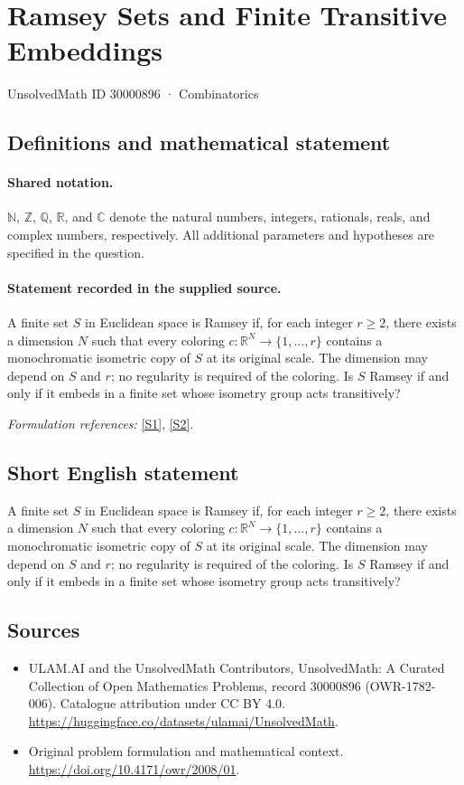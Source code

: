 \documentclass[11pt]{article}
\newcommand{\sref}[2]{\hyperlink{source:#1:#2}{[S#2]}}
\begin{document}
\setcounter{section}{30000895}
\section{Ramsey Sets and Finite Transitive Embeddings}\label{30000896}
{\small UnsolvedMath ID 30000896 · Combinatorics}
\subsection{Definitions and mathematical statement}

\paragraph{Shared notation.}$\mathbb N$, $\mathbb Z$, $\mathbb Q$, $\mathbb R$, and $\mathbb C$ denote the natural numbers, integers, rationals, reals, and complex numbers, respectively. All additional parameters and hypotheses are specified in the question.


\paragraph{Statement recorded in the supplied source.}
A finite set $S$ in Euclidean space is Ramsey if, for each integer $r\ge2$, there exists a dimension $N$ such that every coloring $c:\mathbb R^N\to\{1,\ldots,r\}$ contains a monochromatic isometric copy of $S$ at its original scale. The dimension may depend on $S$ and $r$; no regularity is required of the coloring. Is $S$ Ramsey if and only if it embeds in a finite set whose isometry group acts transitively?
\par\smallskip\textit{Formulation references:} \sref{30000896}{1}, \sref{30000896}{2}.
\subsection{Short English statement}
A finite set $S$ in Euclidean space is Ramsey if, for each integer $r\ge2$, there exists a dimension $N$ such that every coloring $c:\mathbb R^N\to\{1,\ldots,r\}$ contains a monochromatic isometric copy of $S$ at its original scale. The dimension may depend on $S$ and $r$; no regularity is required of the coloring. Is $S$ Ramsey if and only if it embeds in a finite set whose isometry group acts transitively?
\subsection{Sources}
\begin{itemize}
\item[\hypertarget{source:30000896:1}{S1}] ULAM.AI and the UnsolvedMath Contributors, UnsolvedMath: A Curated Collection of Open Mathematics Problems, record 30000896 (OWR-1782-006). Catalogue attribution under CC BY 4.0.
\url{https://huggingface.co/datasets/ulamai/UnsolvedMath}.
\item[\hypertarget{source:30000896:2}{S2}] Original problem formulation and mathematical context.
\url{https://doi.org/10.4171/owr/2008/01}.
\end{itemize}
\label{end:30000896}
\end{document}
